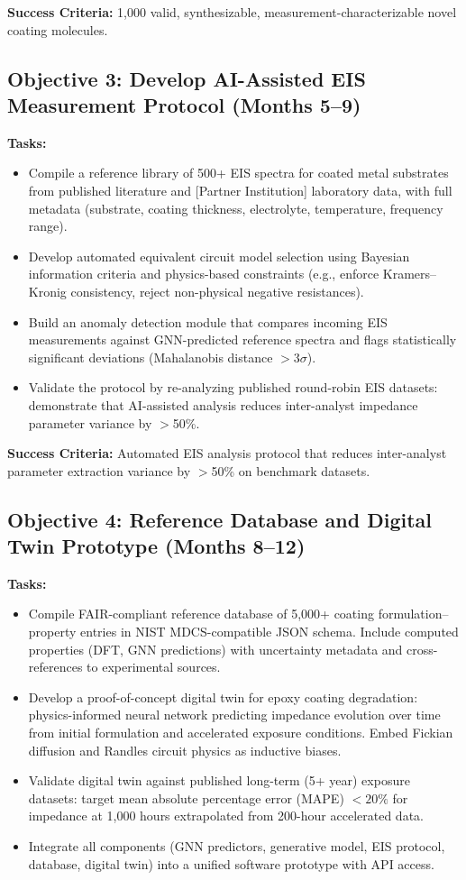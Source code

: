 \documentclass[11pt,letterpaper]{article}
\begin{document}
\textbf{Success Criteria:} 1,000 valid, synthesizable, measurement-characterizable novel coating molecules.

\subsection{Objective 3: Develop AI-Assisted EIS Measurement Protocol (Months 5--9)}

\textbf{Tasks:}
\begin{itemize}[leftmargin=*]
  \item Compile a reference library of 500+ EIS spectra for coated metal substrates from published literature and [Partner Institution] laboratory data, with full metadata (substrate, coating thickness, electrolyte, temperature, frequency range).
  \item Develop automated equivalent circuit model selection using Bayesian information criteria and physics-based constraints (e.g., enforce Kramers--Kronig consistency, reject non-physical negative resistances).
  \item Build an anomaly detection module that compares incoming EIS measurements against GNN-predicted reference spectra and flags statistically significant deviations (Mahalanobis distance $> 3\sigma$).
  \item Validate the protocol by re-analyzing published round-robin EIS datasets: demonstrate that AI-assisted analysis reduces inter-analyst impedance parameter variance by $>$50\%.
\end{itemize}

\textbf{Success Criteria:} Automated EIS analysis protocol that reduces inter-analyst parameter extraction variance by $>$50\% on benchmark datasets.

\subsection{Objective 4: Reference Database and Digital Twin Prototype (Months 8--12)}

\textbf{Tasks:}
\begin{itemize}[leftmargin=*]
  \item Compile FAIR-compliant reference database of 5,000+ coating formulation--property entries in NIST MDCS-compatible JSON schema. Include computed properties (DFT, GNN predictions) with uncertainty metadata and cross-references to experimental sources.
  \item Develop a proof-of-concept digital twin for epoxy coating degradation: physics-informed neural network predicting impedance evolution over time from initial formulation and accelerated exposure conditions. Embed Fickian diffusion and Randles circuit physics as inductive biases.
  \item Validate digital twin against published long-term (5+ year) exposure datasets: target mean absolute percentage error (MAPE) $< 20\%$ for impedance at 1,000 hours extrapolated from 200-hour accelerated data.
  \item Integrate all components (GNN predictors, generative model, EIS protocol, database, digital twin) into a unified software prototype with API access.
\end{itemize}
\end{document}

